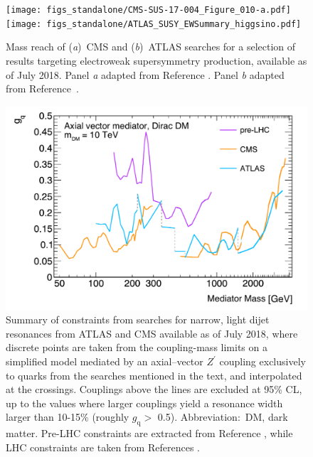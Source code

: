 \documentclass{ar-1col}
\newcommand{\gq}{$g_{\mathrm{q}}$\xspace}
\begin{document}
\clearpage

\begin{figure}[!htpb]
\texttt{[image: figs\_standalone/CMS-SUS-17-004\_Figure\_010-a.pdf]}
\texttt{[image: figs\_standalone/ATLAS\_SUSY\_EWSummary\_higgsino.pdf]}
\caption{Mass reach of (\textit{a})\ CMS and (\textit{b})\ ATLAS searches for a selection of
results targeting electroweak supersymmetry production, available as of
July 2018.
Panel \textit{a} adapted from Reference . 
Panel \textit{b} adapted from Reference~.\label{fig:SUSYSummary_ew}}
\end{figure}

\clearpage

\begin{figure}[!htpb]
\includegraphics[width=\textwidth]{figs_standalone/CouplingMassPlot.pdf}
\caption{Summary of constraints from searches for narrow, light dijet
resonances from ATLAS and CMS available as of
July 2018, where discrete points are taken
from the coupling-mass limits on a simplified model mediated by an
axial--vector $Z^\prime$ coupling exclusively to quarks from the
searches mentioned in the text, and interpolated at the crossings.
Couplings above the lines are excluded at 95\% CL, up to the
values where larger couplings yield a resonance width larger than
10-15\% (roughly \gq $>$ 0.5). Abbreviation:\ DM, dark matter.
Pre-LHC constraints are extracted from Reference ,
while LHC constraints are taken from References \cite{Sirunyan:2017nvi,Aaboud:2018zba,
ATLAS:2016bvn,Sirunyan:2017nvi,Sirunyan:2018xlo,Aaboud:2018fzt,Aaboud:2017yvp}.}
\label{fig:couplingmass}
\end{figure}
\end{document}
